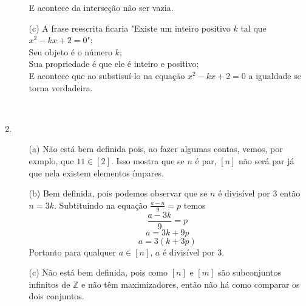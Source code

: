 \documentclass[12pt, a4paper]{article} %
\begin{document}
\begin{enumerate}
\begin{enumerate}
E acontece da interseção não ser vazia.
\item[(c)] A frase reescrita ficaria "Existe um inteiro positivo $k$ tal que $x^2-kx+2=0$";\\
Seu objeto é o número $k$; \\
Sua propriedade é que ele é inteiro e positivo; \\
E acontece que ao substisuí-lo na equação $x^2-kx+2=0$ a igualdade se torna verdadeira.
\end{enumerate}
~
\item
\begin{enumerate}
\item[(a)] Não está bem definida pois, ao fazer algumas contas, vemos, por exmplo, que $11 \in [2]$. Isso mostra que se $n$ é par, $[n]$ não será par já que nela existem elementos ímpares.
\item[(b)] Bem definida, pois podemos observar que se $n$ é divisível por 3 então $n=3k$. Subtituindo na equação $\frac{a-n}{9}=p$ temos $$\frac{a-3k}{9}=p$$  $$a=3k+9p$$ $$a=3(k+3p)$$ Portanto para qualquer $a\in [n]$, $a$ é divisível por 3.
\item[(c)] Não está bem definida, pois como $[n]$ e $[m]$ são subconjuntos infinitos de $\mathbb{Z}$ e não têm maximizadores, então não há como comparar os dois conjuntos.
\end{enumerate}
\end{enumerate}
\end{document}
